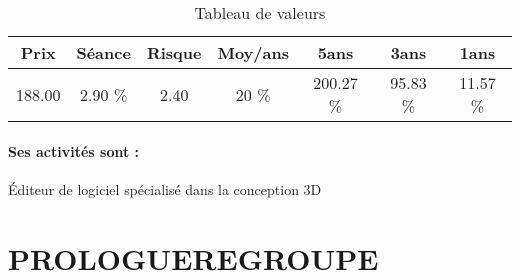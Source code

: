 \documentclass[11pt,a4paper]{report}%
\begin{document}
\begin{table}[H]
  \centering
    \begin{tabular}{|c|c|c|c|c|c|c|}
    \hline
    Prix & Séance & Risque  & Moy/ans & 5ans & 3ans & 1ans \\
    \hline
    188.00 &    2.90 \%    & 2.40 & 20 \% & 200.27 \% & 95.83 \% & 11.57 \% \\
    \hline
    \end{tabular}%
        \label{tab:table_DASSAULT SYSTEMES}%
      \caption{Tableau de valeurs}
\end{table}%

\paragraph{Ses activités sont : } Éditeur de logiciel spécialisé dans la conception 3D 
    
    \newpage

\section{PROLOGUEREGROUPE}
\end{document}
